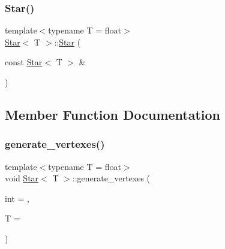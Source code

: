 \mbox{\label{classStar_a047ce2a8d4fb409858555aee98b33c93}} 
\subsubsection{\texorpdfstring{Star()}{Star()}\hspace{0.1cm}{\footnotesize\ttfamily [4/4]}}
{\footnotesize\ttfamily template$<$typename T  = float$>$ \\
\mbox{\hyperlink{classStar}{Star}}$<$ T $>$\+::\mbox{\hyperlink{classStar}{Star}} (\begin{DoxyParamCaption}\item[{const \mbox{\hyperlink{classStar}{Star}}$<$ T $>$ \&}]{ }\end{DoxyParamCaption})\hspace{0.3cm}{\ttfamily [default]}}



\subsection{Member Function Documentation}
\mbox{\label{classStar_ac9ce42a8f7289484594f7f0ab5124849}} 
\subsubsection{\texorpdfstring{generate\+\_\+vertexes()}{generate\_vertexes()}\hspace{0.1cm}{\footnotesize\ttfamily [1/3]}}
{\footnotesize\ttfamily template$<$typename T  = float$>$ \\
void \mbox{\hyperlink{classStar}{Star}}$<$ T $>$\+::generate\+\_\+vertexes (\begin{DoxyParamCaption}\item[{int}]{ = {},  }\item[{T}]{ = {} }\end{DoxyParamCaption})\hspace{0.3cm}{\ttfamily [private]}}

\mbox{\label{classStar_ab46cbc7aca971bc1c07b8d4afe8fba37}} 

